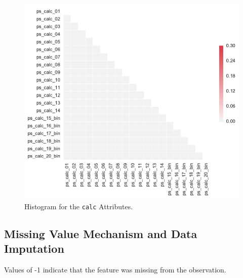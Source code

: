 \documentclass{standalone}
\begin{document}
\begin{figure}[!t]
\centering
\includegraphics[width=.5\textwidth]{fig/corr_calc_col.pdf}
\caption{Histogram for the \lstinline{calc} Attributes.}
\label{fig_calc}
\end{figure}

\subsection{Missing Value Mechanism and Data Imputation}

Values of -1 indicate that the feature was missing from
the observation.
\end{document}
